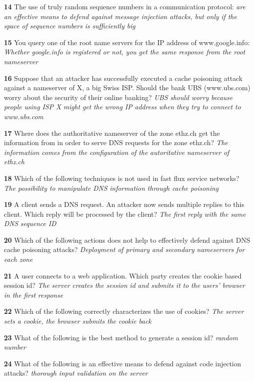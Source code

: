 \textbf{  14}  The use of truly random sequence numbers in a communication protocol:  
\textit{ are an effective means to defend against message injection attacks, but only if the space of sequence numbers is sufficiently big}

\textbf{  15}  You query one of the root name servers for the IP address of www.google.info:  
\textit{ Whether google.info is registered or not, you get the same response from the root nameserver}

\textbf{  16}  Suppose that an attacker has successfully executed a cache poisoning attack against a nameserver of X, a big Swiss ISP. Should the bank UBS (www.ubs.com) worry about the security of their online banking? 
\textit{ UBS should worry because people using ISP X might get the wrong IP address when they try to connect to www.ubs.com}

\textbf{  17}  Where does the authoritative nameserver of the zone ethz.ch get the information from in order to serve DNS requests for the zone ethz.ch? 
\textit{ The information comes from the configuration of the autoritative nameserver of ethz.ch}

\textbf{  18}  Which of the following techniques is not used in fast flux service networks?  
\textit{ The possibility to manipulate DNS information through cache poisoning}

\textbf{  19}  A client sends a DNS request. An attacker now sends multiple replies to this client. Which reply will be processed by the client? 
\textit{ The first reply with the same DNS sequence ID}

\textbf{  20}  Which of the following actions does not help to effectively defend against DNS cache poisoning attacks? 
\textit{ Deployment of primary and secondary nameservers for each zone}

\textbf{  21}  A user connects to a web application. Which party creates the cookie based session id?  
\textit{ The server creates the session id and submits it to the users' browser in the first response}

\textbf{  22}  Which of the following correctly characterizes the use of cookies?  
\textit{ The server sets a cookie, the browser submits the cookie back}

\textbf{  23}  What of the following is the best method to generate a session id?  
\textit{ random number}

\textbf{  24}  What of the following is an effective means to defend against code injection attacks?  
\textit{ thorough input validation on the server}

